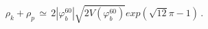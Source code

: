 \begin{equation} \label{psvol1}
\rho_{k} + \rho_{p} \, \simeq \, 
2 |\varphi_b^{60}| \sqrt{2 V(\varphi_b^{60})} exp(\sqrt{12} \pi - 1) \, .
\end{equation}

